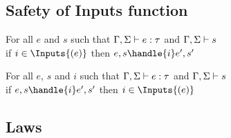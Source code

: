 \subsection{Safety of Inputs function}

\begin{theorem}
  For all $e$ and $s$ such that $\Gamma,\Sigma\vdash e:\tau$ and $\Gamma,\Sigma\vdash s$\\
  if $i\in\Inputs{(e)}$ then $e,s\handle{i}e',s'$
  \label{thmsafetyi1}
\end{theorem}

\begin{theorem}
  For all $e$, $s$ and $i$ such that $\Gamma,\Sigma\vdash e:\tau$ and $\Gamma,\Sigma\vdash s$\\
  if $e,s\handle{i}e',s'$ then  $i\in\Inputs{(e)}$
  \label{thmsafetyi2}
\end{theorem}
\subsection{Laws}
